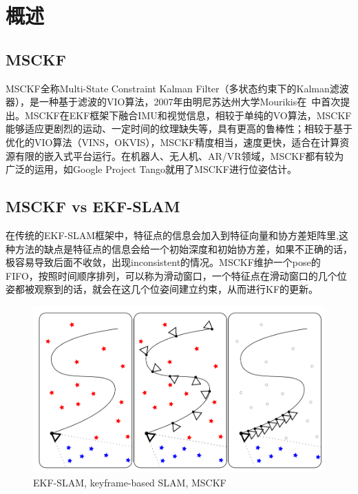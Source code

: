 \documentclass[12pt,a4paper]{article}
\begin{document}
\maketitle
\tableofcontents

\noindent
\setlength{\parindent}{2em}
\setlength{\parskip}{0.3em}
\linespread{1}

\newpage
\section{概述}

\subsection{MSCKF}

MSCKF全称Multi-State Constraint Kalman Filter（多状态约束下的Kalman滤波器），是一种基于滤波的VIO算法，2007年由明尼苏达州大学Mourikis在~\cite{mourikis2007multi}中首次提出。MSCKF在EKF框架下融合IMU和视觉信息，相较于单纯的VO算法，MSCKF能够适应更剧烈的运动、一定时间的纹理缺失等，具有更高的鲁棒性；相较于基于优化的VIO算法（VINS，OKVIS），MSCKF精度相当，速度更快，适合在计算资源有限的嵌入式平台运行。在机器人、无人机、AR/VR领域，MSCKF都有较为广泛的运用，如Google Project Tango就用了MSCKF进行位姿估计。

\subsection{MSCKF vs EKF-SLAM}

在传统的EKF-SLAM框架中，特征点的信息会加入到特征向量和协方差矩阵里,这种方法的缺点是特征点的信息会给一个初始深度和初始协方差，如果不正确的话，极容易导致后面不收敛，出现inconsistent的情况。MSCKF维护一个pose的FIFO，按照时间顺序排列，可以称为滑动窗口，一个特征点在滑动窗口的几个位姿都被观察到的话，就会在这几个位姿间建立约束，从而进行KF的更新。~\cite{xinliang-zhong-msckf_notes}

\begin{figure}[!htbp]
\centering
\includegraphics[scale=0.25]{images/ekf-slam-vs-msckf.png}
\caption{EKF-SLAM, keyframe-based SLAM, MSCKF}
\end{figure}
\end{document}
